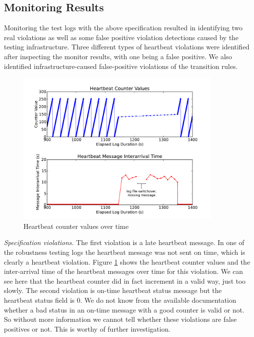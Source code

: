 
\subsection{Monitoring Results}
Monitoring the test logs with the above specification resulted in identifying two real violations as well as some false positive violation detections caused by the testing infrastructure.
%
Three different types of heartbeat violations were identified after inspecting the monitor results, with one being a false positive.
We also identified infrastructure-caused false-positive violations of the transition rules.

\begin{figure}[t]
		\centering
		\includegraphics[width=4.0in]{img/hb1}
		\caption{Heartbeat counter values over time}
		\label{fig:hb_arrival}
\end{figure}

\textit{Specification violations.}
The first violation is a late heartbeat message. In one of the robustness testing logs the heartbeat message was not sent on time, which is clearly a heartbeat violation. Figure \ref{fig:hb_arrival} shows the heartbeat counter values and the inter-arrival time of the heartbeat messages over time for this violation. We can see here that the heartbeat counter did in fact increment in a valid way, just too slowly.
The second violation is on-time heartbeat status message but the heartbeat status field is 0.
We do not know from the available documentation whether a bad status in an on-time message with a good counter is valid or not. So without more information we cannot tell whether these violations are false positives or not. This is worthy of further investigation.



